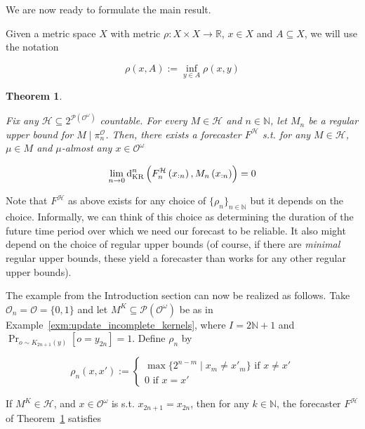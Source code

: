 \documentclass[11pt]{article}
\theoremstyle{definition}
\theoremstyle{plain}
\newtheorem{theorem}{Theorem}%
\newcommand{\Nats}{\mathbb{N}}
\newcommand{\Reals}{\mathbb{R}}
\newcommand{\Sq}[2]{\{#1\}_{#2 \in \Nats}}
\newcommand{\Sqn}[1]{\Sq{#1}{n}}
\newcommand{\PM}{\mathcal{P}}
\newcommand{\DKR}{\operatorname{d}_{\textnormal{KR}}}
\newcommand{\Ob}{\mathcal{O}}
\newcommand{\OO}{\Ob^\omega}
\newcommand{\PO}{\pi^\Ob}
\newcommand{\PMO}{\PM(\OO)}
\newcommand{\MC}{\mathcal{H}}
\begin{document}
We are now ready to formulate the main result.

Given a metric space $X$ with metric $\rho: X \times X \rightarrow \Reals$, $x \in X$ and $A \subseteq X$, we will use the notation

\begin{equation}
\rho\left(x,A\right):=\inf_{y \in A} \rho\left(x,y\right)
\end{equation}

\begin{theorem}
\label{thm:main}

Fix any $\MC \subseteq 2^{\PMO}$ countable. For every $M \in \MC$ and $n \in \Nats$, let $M_n$ be a regular upper bound for $M \mid \PO_n$. Then, there exists a forecaster $F^\MC$ s.t. for any $M \in \MC$, $\mu \in M$ and $\mu$-almost any $x \in \OO$

\begin{equation}
\label{eqn:thm_main}
\lim_{n \rightarrow 0} \DKR^n\left(F^\MC_n\left(x_{:n}\right),M_n\left(x_{:n}\right)\right) = 0
\end{equation}

\end{theorem}

Note that $F^\MC$ as above exists for any choice of $\Sqn{\rho_n}$ but it depends on the choice. Informally, we can think of this choice as determining the duration of the future time period over which we need our forecast to be reliable. It also might depend on the choice of regular upper bounds (of course, if there are \emph{minimal} regular upper bounds, these yield a forecaster than works for any other regular upper bounds).

The example from the Introduction section can now be realized as follows. Take $\Ob_n=\Ob=\{0,1\}$ and let $M^K \subseteq \PMO$ be as in Example~\ref{exm:update_incomplete_kernels}, where $I = 2\Nats+1$ and $\Pr_{o\sim K_{2n+1}(y)}\left[o=y_{2n}\right]=1$. Define $\rho_n$  by

\begin{equation}
\rho_n(x,x'):=\begin{cases} \max\{2^{n-m} \mid x_{m} \ne x'_{m}\} \text{ if } x \ne x' \\ 0 \text{ if } x=x'\end{cases}
\end{equation}

If $M^K \in \MC$, and $x\in\OO$ is s.t. $x_{2n+1}=x_{2n}$, then for any $k \in \Nats$, the forecaster $F^\MC$ of Theorem~\ref{thm:main} satisfies
\end{document}

